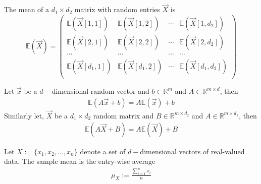 \documentclass[11pt]{elegantbook}
\begin{document}
\begin{definition}
    The mean of a $d_1\times d_2$ matrix with random entries $\vec{X}$ is
    $$\mathbb{E}(\vec{X})=\begin{pmatrix}
        \mathbb{E}(\vec{X}[1,1])&\mathbb{E}(\vec{X}[1,2])&\cdots &\mathbb{E}(\vec{X}[1,d_2])\\
        \mathbb{E}(\vec{X}[2,1])&\mathbb{E}(\vec{X}[2,2])&\cdots &\mathbb{E}(\vec{X}[2,d_2])\\
        \cdots&\cdots&\cdots&\cdots\\
        \mathbb{E}(\vec{X}[d_1,1])&\mathbb{E}(\vec{X}[d_1,2])&\cdots &\mathbb{E}(\vec{X}[d_1,d_2])\\
    \end{pmatrix}$$
\end{definition}

\begin{lemma}
    Let $\vec{x}$ be a $d-$dimensional random vector and $b\in \mathbb{R}^{m}$ and $A\in \mathbb{R}^{m\times d}$, then
    \begin{equation}
        \begin{aligned}
            \mathbb{E}(A \vec{x}+b)=A \mathbb{E}(\vec{x})+b
        \end{aligned}
        \nonumber
    \end{equation}
    Similarly let, $\vec{X}$ be a $d_1 \times d_2$ random matrix and $B\in \mathbb{R}^{m\times d_2}$ and $A\in \mathbb{R}^{m\times d_1}$, then
    \begin{equation}
        \begin{aligned}
            \mathbb{E}(A \vec{X}+B)=A \mathbb{E}(\vec{X})+B
        \end{aligned}
        \nonumber
    \end{equation}
\end{lemma}

\begin{definition}
    Let $X := \{x_1, x_2,..., x_n\}$ denote a set of $d-$dimensional vectors of real-valued data. The sample mean is the entry-wise average
    \begin{equation}
        \begin{aligned}
            \mu_X:=\frac{\sum_{i=1}^n x_i}{n}
        \end{aligned}
        \nonumber
    \end{equation}
\end{definition}
\end{document}
